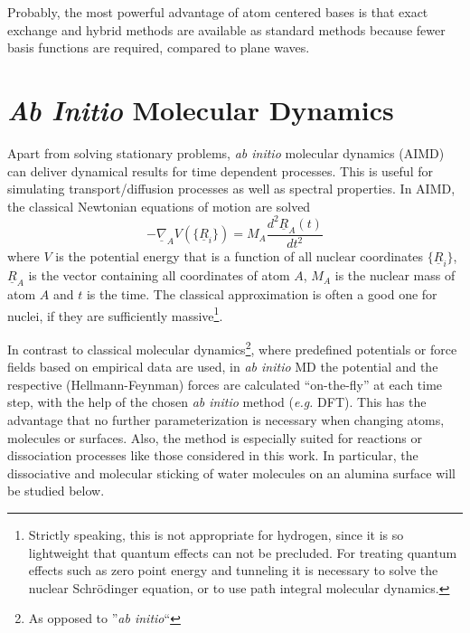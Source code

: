 \documentclass[11pt,DIV=13,BCOR=5mm,a4paper,headinclude]{scrbook}
\renewcommand{\vec}[1]{\underline{#1}}
\begin{document}
Probably, the most powerful advantage of atom centered bases is that exact exchange and hybrid methods are available as standard methods because fewer basis functions are required, compared to plane waves.


\section{\textit{Ab Initio} Molecular Dynamics}
Apart from solving stationary problems, \textit{ab initio} molecular dynamics (AIMD) can deliver dynamical results for time dependent processes\cite{jensen,marx_hutter_AIMD}.
This is useful for simulating transport/diffusion processes as well as spectral properties.
In AIMD, the classical Newtonian equations of motion are solved
\begin{equation}
 -\vec{\nabla}_A V(\{\vec{R}_i\})=M_A\frac{d^2 \vec{R}_A(t)}{dt^2}
\end{equation}
where $V$ is the potential energy that is a function of all nuclear coordinates $\{\vec{R}_i\}$, $\vec{R}_A$ is the vector containing all coordinates of atom $A$, $M_A$ is the nuclear mass of atom $A$ and $t$ is the time.
The classical approximation is often a good one for nuclei, if they are sufficiently massive\footnote{Strictly speaking, this is not appropriate for hydrogen, since it is so lightweight that quantum effects can not be precluded.
For treating quantum effects such as zero point energy and tunneling it is necessary to solve the nuclear Schrödinger equation, or to use path integral molecular dynamics\cite{Marx1996}.}.


In contrast to classical molecular dynamics\footnote{As opposed to ''\textit{ab initio}``}, where predefined potentials or force fields based on empirical data are used, in \textit{ab initio} MD the potential and the respective (Hellmann-Feynman) forces are calculated ``on-the-fly'' at each time step, with the help of the chosen \textit{ab initio} method (\textit{e.g.} DFT).
This has the advantage that no further parameterization is necessary when changing atoms, molecules or surfaces.
Also, the method is especially suited for reactions or dissociation processes like those considered in this work.
In particular, the dissociative and molecular sticking of water molecules on an alumina surface will be studied below.
\end{document}
